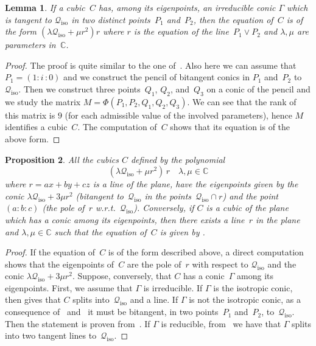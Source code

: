 \documentclass[a4paper, 11pt, reqno]{amsart}
\theoremstyle{plain}
\newtheorem{lemma}{Lemma}[section]
\newtheorem{prop}[lemma]{Proposition}
\theoremstyle{definition}
\newcommand{\C}{\mathbb{C}}
\newcommand{\iii}{\textit{i}\,}
\newcommand{\iso}{\mathcal{Q}_{\mathrm{iso}}}
\begin{document}
\begin{lemma}
\label{lemma:bitangentToCiso}
If a cubic~$C$ has, among its eigenpoints, an irreducible conic $\Gamma$
which is tangent to $\iso$ in two distinct points~$P_1$ and~$P_2$, then
the equation of~$C$ is of the form $(\lambda \iso + \mu r^2)r$ where
$r$ is the equation of the line~$P_1\vee P_2$ and $\lambda, \mu$ are parameters
in~$\C$.
\end{lemma}
\begin{proof}
The proof is quite similar to the one of~. Also
here we can assume that $P_1 = (1: \iii: 0)$ and we construct the pencil of
bitangent conics in $P_1$ and~$P_2$ to $\iso$. Then we construct three
points~$Q_1$, $Q_2$, and~$Q_3$ on a conic of the pencil
and we study the matrix $M = \Phi(P_1, P_2, Q_1, Q_2, Q_3)$. We can see
that the rank of this matrix is $9$ (for each admissible value of the
involved parameters), hence $M$ identifies a cubic~$C$. The computation
of~$C$ shows that its equation is of the above form.
\end{proof}

\begin{prop}
All the cubics $C$ defined by the polynomial
%
\begin{equation}
\label{cub_conica_eig}
  (\lambda \iso + \mu r^2) \, r \quad \mbox{$\lambda, \mu \in \C$}
\end{equation}
%
where $r=ax+by+cz$ is a line of the plane,
have the eigenpoints given by the conic
$\lambda \iso+3\mu r^2$ (bitangent to~$\iso$ in the points~$\iso \cap r$)
and the point~$(a:b:c)$ (the pole of~$r$
w.r.t.~$\iso$). Conversely, if
$C$ is a cubic of the plane which has a conic among its eigenpoints,
then there exists a line~$r$ in the plane and $\lambda, \mu \in \C$
such that the equation of~$C$ is given by .
\end{prop}
\begin{proof}
If the equation of~$C$ is of the form described above, a direct computation
shows that the eigenpoints of~$C$ are the pole of~$r$ with respect to $\iso$
and the conic $\lambda \iso+3\mu r^2$. Suppose, conversely, that $C$ has
a conic~$\Gamma$ among its eigenpoints. 
First, we assume that $\Gamma$ is irreducible.
If $\Gamma$ is the isotropic conic,
then  gives that $C$ splits into~$\iso$ and a line.
If $\Gamma$ is not the isotropic conic, as a consequence
of~ and~ it must be bitangent,
in two points~$P_1$ and~$P_2$, to~$\iso$. 
Then the statement is proven from~. 
If $\Gamma$ is reducible,
from~ we have that $\Gamma$ splits
into two tangent lines to~$\iso$.
\end{proof}
\end{document}
